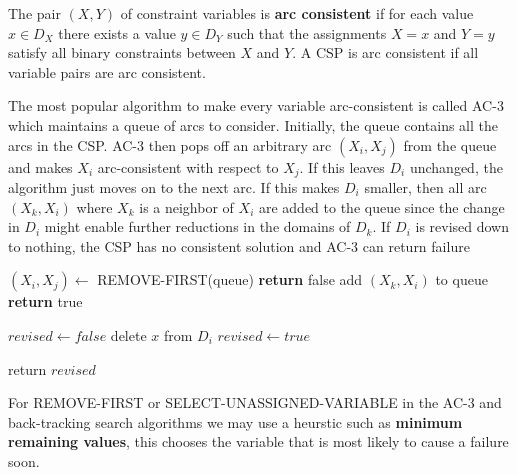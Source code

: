 \documentclass{article}
\begin{document}
The pair $(X,Y)$ of constraint variables is \textbf{arc consistent} if for each value $x \in D_X$ there exists a value $y \in D_Y$ such that the assignments $X=x$ and $Y=y$ satisfy all binary constraints between $X$ and $Y$. A CSP is arc consistent if all variable pairs are arc consistent. \newline

The most popular algorithm to make every variable arc-consistent is called AC-3 which maintains a queue of arcs to consider. Initially, the queue contains all the arcs in the CSP. AC-3 then pops off an arbitrary arc $(X_i,X_j)$ from the queue and makes $X_i$ arc-consistent with respect to $X_j$. If this leaves $D_i$ unchanged, the algorithm just moves on to the next arc. If this makes $D_i$ smaller, then all arc $(X_k,X_i)$ where $X_k$ is a neighbor of $X_i$ are added to the queue since the change in $D_i$ might enable further reductions in the domains of $D_k$. If $D_i$ is revised down to nothing, the CSP has no consistent solution and AC-3 can return failure


\begin{algorithm}
\begin{algorithmic}

        \State $(X_i,X_j) \leftarrow$ REMOVE-FIRST(queue)
                \State \textbf{return} false
                    \State add $(X_k,X_i)$ to queue
                \EndFor
            \EndIf
        \EndIf
    \EndWhile 
    \State \textbf{return} true 
\EndProcedure


    \State $revised \leftarrow false$
            \State delete $x$ from $D_i$
            \State $revised \leftarrow true$
        \EndIf
        
    \EndFor

    \State return $revised$

\EndProcedure

\end{algorithmic}
\end{algorithm}

For REMOVE-FIRST or SELECT-UNASSIGNED-VARIABLE in the AC-3 and back-tracking search algorithms we may use a heurstic such as \textbf{minimum remaining values}, this chooses the variable that is most likely to cause a failure soon.  
\end{document}
